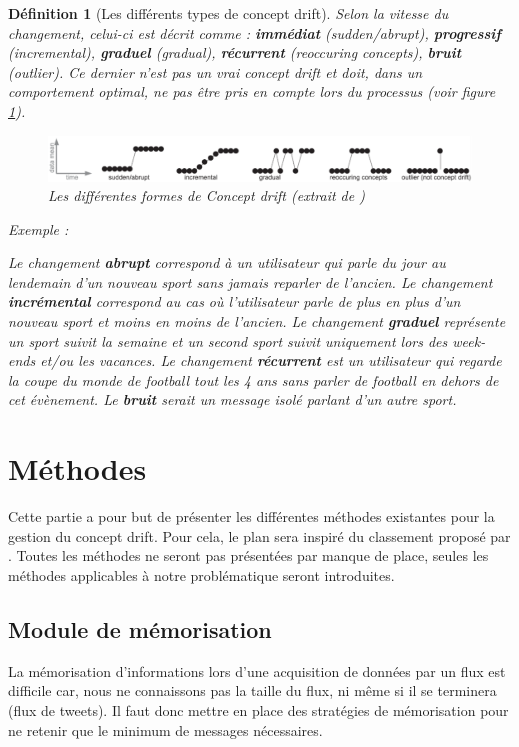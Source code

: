 \documentclass[utf8]{stageM2R} %
\newtheorem{mydef}{Définition}
\theoremstyle{remark}
\renewcommand{\emph}{\textbf}
\newenvironment{exemple}{%
\upshape Exemple :%
    \small     %
}{%
}
\begin{document}
\begin{mydef}[Les différents types de concept drift]
\label{types_concept_drift}
Selon la vitesse du changement, celui-ci est décrit comme \cite{Gama2014} : \emph{immédiat} (sudden/abrupt), \emph{progressif} (incremental), \emph{graduel} (gradual), \emph{récurrent} (reoccuring concepts), \emph{bruit} (outlier). Ce dernier n'est pas un vrai concept drift et doit, dans un comportement optimal, ne pas être pris en compte lors du processus (voir figure \ref{formes_cd}).
\begin{figure}[!h]
   \includegraphics[width=.95\textwidth]{imgs/types_concept_drift.png}
	\caption{\label{formes_cd}Les différentes formes de Concept drift (extrait de \cite{Gama2014})}
\end{figure}

\begin{exemple}
Le changement \emph{abrupt} correspond à un utilisateur qui parle du jour au lendemain d'un nouveau sport sans jamais reparler de l'ancien.
Le changement \emph{incrémental} correspond au cas où l'utilisateur parle de plus en plus d'un nouveau sport et moins en moins de l'ancien.
Le changement \emph{graduel} représente un sport suivit la semaine et un second sport suivit uniquement lors des week-ends et/ou les vacances.
Le changement \emph{récurrent} est un utilisateur qui regarde la coupe du monde de football tout les 4 ans sans parler de football en dehors de cet évènement.
Le \emph{bruit} serait un message isolé parlant d'un autre sport.
\end{exemple}
\end{mydef}


\section{Méthodes}
\label{methodes}

Cette partie a pour but de présenter les différentes méthodes existantes pour la gestion du concept drift. Pour cela, le plan sera inspiré du classement proposé par \cite{Gama2013}. Toutes les méthodes ne seront pas présentées par manque de place, seules les méthodes applicables à notre problématique seront introduites.
\subsection{Module de mémorisation}
La mémorisation d'informations lors d'une acquisition de données par un flux est difficile car, nous ne connaissons pas la taille du flux, ni même si il se terminera (flux de tweets). Il faut donc mettre en place des stratégies de mémorisation pour ne retenir que le minimum de messages nécessaires.
\end{document}
